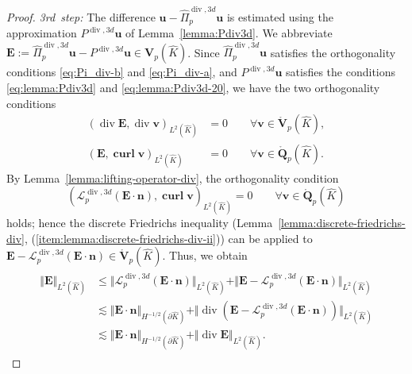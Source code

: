 \documentclass{article}
\newcommand{\hatPidivcom}{\widehat\Pi^{\operatorname*{div},3d}_{p}}
\begin{document}
\begin{proof}
\emph{3rd~step:} 
The difference ${\mathbf u} - \hatPidivcom {\mathbf u}$ is estimated using 
the approximation $P^{\operatorname{div},3d} {\mathbf u}$ of Lemma~\ref{lemma:Pdiv3d}. 
We abbreviate 
$\mathbf{E}:=\hatPidivcom\mathbf{u}-P^{\operatorname*{div},3d}\mathbf{u}\in \mathbf{V}_p(\widehat{K})$. 
Since $\hatPidivcom\mathbf{u}$ satisfies the orthogonality conditions \eqref{eq:Pi_div-b} 
and \eqref{eq:Pi_div-a}, and $P^{\operatorname*{div},3d}\mathbf{u}$ satisfies 
the conditions \eqref{eq:lemma:Pdiv3d} and \eqref{eq:lemma:Pdiv3d-20}, we  have the two orthogonality conditions 
\begin{subequations}
\label{eq:thm:H1div-approximation-20}
\begin{align}
\label{eq:thm:H1div-approximation-20-a}
(\operatorname*{div}\mathbf{E},\operatorname*{div}\mathbf{v})_{L^2(\widehat{K})} &= 0 \qquad \forall \mathbf{v}\in \mathring{\mathbf{V}}_p(\widehat{K}),
\\ 
\label{eq:thm:H1div-approximation-20-b}
(\mathbf{E},\operatorname*{\mathbf{curl}}\mathbf{v})_{L^2(\widehat{K})} 
&= 0 \qquad \forall \mathbf{v}\in \mathring{\mathbf{Q}}_p(\widehat{K}).
\end{align}
\end{subequations}
By Lemma~\ref{lemma:lifting-operator-div}, the orthogonality condition
\[
(\boldsymbol{\mathcal{L}}^{\operatorname*{div},3d}_p(\mathbf{E}\cdot\mathbf{n}),\operatorname*{\mathbf{curl}}\mathbf{v})_{L^2(\widehat{K})} = 0 \qquad \forall \mathbf{v}\in \mathring{\mathbf{Q}}_p(\widehat{K})
\]
holds; hence the discrete Friedrichs inequality 
(Lemma~\ref{lemma:discrete-friedrichs-div}, (\ref{item:lemma:discrete-friedrichs-div-ii})) 
can be applied to $\mathbf{E}-\boldsymbol{\mathcal{L}}^{\operatorname*{div},3d}_p(\mathbf{E}\cdot\mathbf{n}) \in \mathring{\mathbf{V}}_p(\widehat{K})$. Thus, we obtain 
\begin{align}
\label{eq:thm:H1div-approximation-30}
\begin{split}
\Vert\mathbf{E}\Vert_{L^2(\widehat{K})} &\leq \Vert\boldsymbol{\mathcal{L}}^{\operatorname*{div},3d}_p(\mathbf{E}\cdot\mathbf{n})\Vert_{L^2(\widehat{K})} + \Vert\mathbf{E}-\boldsymbol{\mathcal{L}}^{\operatorname*{div},3d}_p
(\mathbf{E}\cdot\mathbf{n})\Vert_{L^2(\widehat{K})} \\
&\lesssim \Vert\mathbf{E}\cdot\mathbf{n}\Vert_{H^{-1/2}(\partial\widehat{K})} + \Vert\operatorname*{div}(\mathbf{E}-\boldsymbol{\mathcal{L}}^{\operatorname*{div},3d}_p(\mathbf{E}\cdot\mathbf{n}))\Vert_{L^2(\widehat{K})} \\
&\lesssim \Vert\mathbf{E}\cdot\mathbf{n}\Vert_{H^{-1/2}(\partial\widehat{K})} + \Vert\operatorname*{div}\mathbf{E}\Vert_{L^2(\widehat{K})}.

\end{split}
\end{align}
\end{proof}
\end{document}
